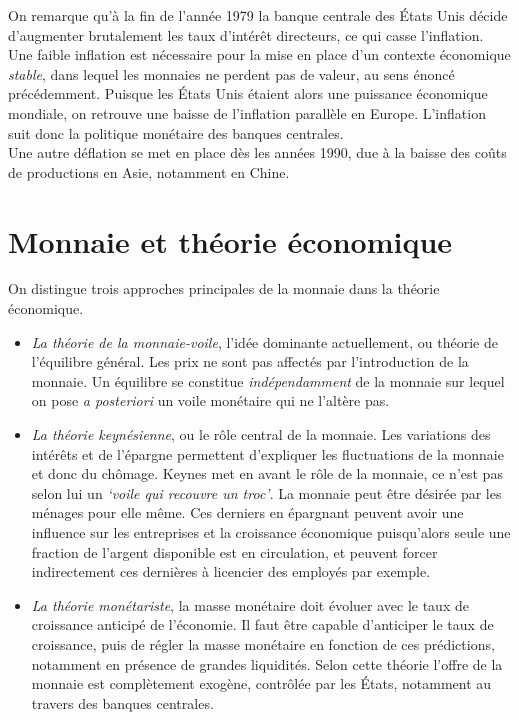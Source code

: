 \documentclass[main.tex]{subfiles}
\begin{document}
        On remarque qu'à la fin de l'année 1979 la banque centrale des États Unis décide d'augmenter brutalement les taux d'intérêt directeurs, ce qui casse l'inflation. Une faible inflation est nécessaire pour la mise en place d'un contexte économique \emph{stable}, dans lequel les monnaies ne perdent pas de valeur, au sens énoncé précédemment. Puisque les États Unis étaient alors une puissance économique mondiale, on retrouve une baisse de l'inflation parallèle en Europe. L'inflation suit donc la politique monétaire des banques centrales. \\

        Une autre déflation se met en place dès les années 1990, due à la baisse des coûts de productions en Asie, notamment en Chine.

        \section{Monnaie et théorie économique}

        On distingue trois approches principales de la monnaie dans la théorie économique.
        \begin{itemize}
                \item \emph{La théorie de la monnaie-voile}, l'idée dominante actuellement, ou théorie de l'équilibre général. Les prix ne sont pas affectés par l'introduction de la monnaie. Un équilibre se constitue \emph{indépendamment} de la monnaie sur lequel on pose \textit{a posteriori} un voile monétaire qui ne l'altère pas.

                \item \emph{La théorie keynésienne}, ou le rôle central de la monnaie. Les variations des intérêts et de l'épargne permettent d'expliquer les fluctuations de la monnaie et donc du chômage. Keynes met en avant le rôle de la monnaie, ce n'est pas selon lui un \emph{`voile qui recouvre un troc'}. La monnaie peut être désirée par les ménages pour elle même. Ces derniers en épargnant peuvent avoir une influence sur les entreprises et la croissance économique puisqu'alors seule une fraction de l'argent disponible est en circulation, et peuvent forcer indirectement ces dernières à licencier des employés par exemple.

                \item \emph{La théorie monétariste}, la masse monétaire doit évoluer avec le taux de croissance anticipé de l'économie. Il faut être capable d'anticiper le taux de croissance, puis de régler la masse monétaire en fonction de ces prédictions, notamment en présence de grandes liquidités. Selon cette théorie l'offre de la monnaie est complètement exogène, contrôlée par les États, notamment au travers des banques centrales.
        \end{itemize}
\end{document}
